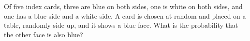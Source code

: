 Of five index cards, three are blue on both sides, one is white on both sides, and one has a blue side and a white side. A card is chosen at random and placed on a table, randomly side up, and it shows a blue face. What is the probability that the other face is also blue?
